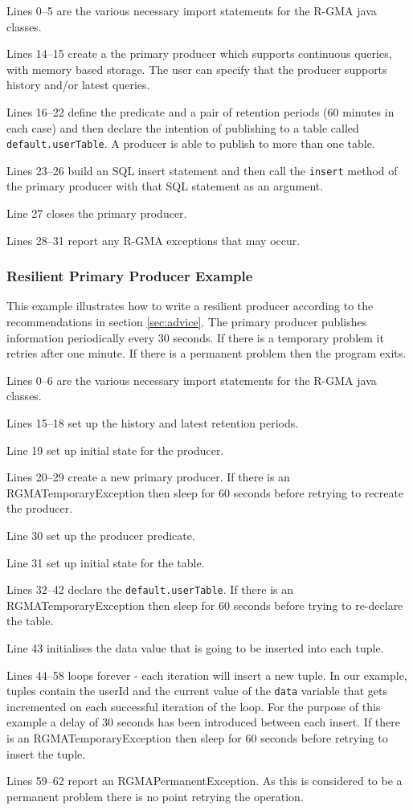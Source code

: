 Lines 0--5 are the various necessary import statements for the R-GMA
java classes.

Lines 14--15 create a the primary producer which supports continuous
queries, with memory based storage. The user can specify that the
producer supports history and/or latest queries.

Lines 16--22 define the predicate and a pair of retention periods (60
minutes in each case) and then declare the intention of publishing to
a table called \texttt{default.userTable}. A producer is able to
publish to more than one table.

Lines 23--26 build an SQL insert statement and then call
the \texttt{insert} method of the primary producer with that SQL
statement as an argument.

Line 27 closes the primary producer.

Lines 28--31 report any R-GMA exceptions that may occur.

\subsubsection{Resilient Primary Producer Example}

This example illustrates how to write a resilient producer according
to the recommendations in section \ref{sec:advice}. The primary
producer publishes information periodically every 30 seconds. If there
is a temporary problem it retries after one minute. If there is a
permanent problem then the program exits.



Lines 0--6 are the various necessary import statements for the R-GMA
java classes.

Lines 15--18 set up the history and latest retention periods.

Line 19 set up initial state for the producer.

Lines 20--29 create a new primary producer. If there is an
RGMATemporaryException then sleep for 60 seconds before retrying to
recreate the producer.

Line 30 set up the producer predicate.

Line 31 set up initial state for the table.

Lines 32--42 declare the \texttt{default.userTable}. If there is an
RGMATemporaryException then sleep for 60 seconds before trying to
re-declare the table.

Line 43 initialises the data value that is going to be inserted into
each tuple.

Lines 44--58 loops forever - each iteration will insert a new
tuple. In our example, tuples contain the userId and the current value
of the \texttt{data} variable that gets incremented on each successful
iteration of the loop. For the purpose of this example a delay of 30
seconds has been introduced between each insert. If there is an
RGMATemporaryException then sleep for 60 seconds before retrying to
insert the tuple.

Lines 59--62 report an RGMAPermanentException. As this is considered
to be a permanent problem there is no point retrying the operation.
